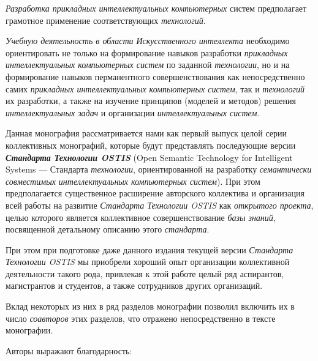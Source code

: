 \begin{SCn}
{	\textit{Разработка прикладных интеллектуальных компьютерных} систем  предполагает грамотное применение соответствующих \textit{технологий}.
	
	
	\textit{Учебную деятельность в области Искусственного интеллекта} необходимо ориентировать не только на формирование навыков разработки \textit{прикладных интеллектуальных компьютерных систем} по заданной \textit{технологии}, но и на формирование навыков перманентного совершенствования как непосредственно самих \textit{прикладных интеллектуальных компьютерных систем}, так и \textit{технологий} их разработки, а также на изучение принципов (моделей и методов) решения \textit{интеллектуальных задач} и организации \textit{интеллектуальных систем}.



Данная монография рассматривается нами как первый выпуск целой серии коллективных монографий, которые будут представлять последующие версии \textbf{\textit{Стандарта Технологии OSTIS}} (Open Semantic Technology for Intelligent Systems --- Стандарта \textit{технологии}, ориентированной на разработку \textit{семантически совместимых интеллектуальных компьютерных систем}). При этом предполагается существенное расширение авторского коллектива и организация всей работы на развитие \textit{Стандарта Технологии OSTIS} как \textit{открытого проекта}, целью которого является коллективное совершенствование \textit{базы знаний}, посвященной детальному описанию этого \textit{стандарта}.

При этом при подготовке даже данного издания текущей версии \textit{Стандарта Технологии OSTIS} мы приобрели хороший опыт организации коллективной деятельности такого рода, привлекая к этой работе целый ряд аспирантов, магистрантов и студентов, а также сотрудников других организаций.

Вклад некоторых из них в ряд разделов монографии позволил включить их в число \textit{соавторов} этих разделов, что отражено непосредственно в тексте монографии.

Авторы выражают благодарность:

}
\end{SCn}
